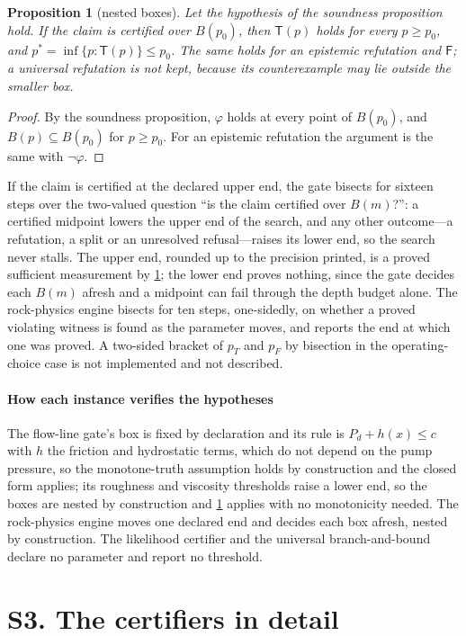 \documentclass[preprint,11pt,a4paper]{elsarticle}
\newtheorem{proposition}{Proposition}
\theoremstyle{definition}
\newcommand{\Tp}{\mathsf{T}}
\newcommand{\Fp}{\mathsf{F}}
\begin{document}
\begin{proposition}[nested boxes]\label{prop:nested}
Let the hypothesis of the soundness proposition hold. If the claim is certified over $B(p_0)$, then $\Tp(p)$ holds for every $p\ge p_0$, and $p^*=\inf\{p:\Tp(p)\}\le p_0$. The same holds for an epistemic refutation and $\Fp$; a universal refutation is not kept, because its counterexample may lie outside the smaller box.
\end{proposition}
\begin{proof}
By the soundness proposition, $\varphi$ holds at every point of $B(p_0)$, and $B(p)\subseteq B(p_0)$ for $p\ge p_0$. For an epistemic refutation the argument is the same with $\neg\varphi$.
\end{proof}

If the claim is certified at the declared upper end, the gate bisects for sixteen steps over the two-valued question ``is the claim certified over $B(m)$?'': a certified midpoint lowers the upper end of the search, and any other outcome---a refutation, a split or an unresolved refusal---raises its lower end, so the search never stalls. The upper end, rounded up to the precision printed, is a proved sufficient measurement by \cref{prop:nested}; the lower end proves nothing, since the gate decides each $B(m)$ afresh and a midpoint can fail through the depth budget alone. The rock-physics engine bisects for ten steps, one-sidedly, on whether a proved violating witness is found as the parameter moves, and reports the end at which one was proved. A two-sided bracket of $p_T$ and $p_F$ by bisection in the operating-choice case is not implemented and not described.

\paragraph{How each instance verifies the hypotheses}
The flow-line gate's box is fixed by declaration and its rule is $P_d+h(x)\le c$ with $h$ the friction and hydrostatic terms, which do not depend on the pump pressure, so the monotone-truth assumption holds by construction and the closed form applies; its roughness and viscosity thresholds raise a lower end, so the boxes are nested by construction and \cref{prop:nested} applies with no monotonicity needed. The rock-physics engine moves one declared end and decides each box afresh, nested by construction. The likelihood certifier and the universal branch-and-bound declare no parameter and report no threshold.

\section*{S3. The certifiers in detail}
\end{document}
